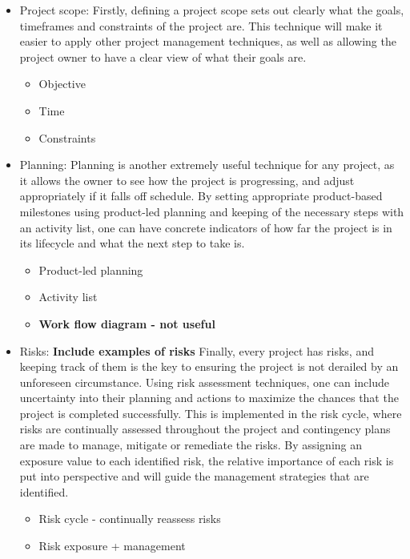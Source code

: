 \documentclass[12pt]{article}
\begin{document}
\begin{itemize}

    \item Project scope:
    Firstly, defining a project scope sets out clearly what the goals, timeframes and constraints of the project are. This technique will make it easier to apply other project management techniques, as well as allowing the project owner to have a clear view of what their goals are.
    \begin{itemize}
        \item Objective
        \item Time
        \item Constraints
    \end{itemize}

    \item Planning:
    Planning is another extremely useful technique for any project, as it allows the owner to see how the project is progressing, and adjust appropriately if it falls off schedule.
    By setting appropriate product-based milestones using product-led planning and keeping of the necessary steps with an activity list, one can have concrete indicators of how far the project is in its lifecycle and what the next step to take is.
    \begin{itemize}
        \item Product-led planning
        \item Activity list
        \item \textbf{Work flow diagram \-- not useful}
    \end{itemize}

    \item Risks: \textbf{Include examples of risks}
    Finally, every project has risks, and keeping track of them is the key to ensuring the project is not derailed by an unforeseen circumstance. Using risk assessment techniques, one can include uncertainty into their planning and actions to maximize the chances that the project is completed successfully.
    This is implemented in the risk cycle, where risks are continually assessed throughout the project and contingency plans are made to manage, mitigate or remediate the risks. By assigning an exposure value to each identified risk, the relative importance of each risk is put into perspective and will guide the management strategies that are identified.
    \begin{itemize}
        \item Risk cycle \-- continually reassess risks
        \item Risk exposure + management
    \end{itemize}



\end{itemize}
\end{document}
